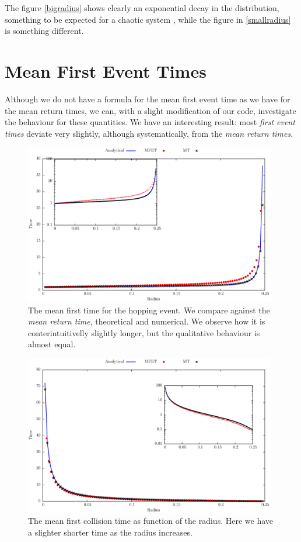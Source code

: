 \documentclass[a4paper,10pt, jcp, aps, preprint]{revtex4-1}
\begin{document}
The figure \ref{bigradius} shows clearly an exponential decay in the
distribution, something to be expected for a chaotic system \cite{OttLibro} , 
while the
figure in \ref{smallradius} is something different. 

\section{Mean First Event Times}

Although we do not have a formula for the mean first event time as
we have for the mean return times, we can, with a slight modification
of our code, investigate the behaviour for these quantities. We have 
an interesting result: most \emph{first event times} deviate very slightly,
although systematically, from the \emph{mean return times}.


\begin{figure}[h]
  \centering
  \includegraphics[width=0.98\textwidth]{./FigurasPerfectas/FistHopTime01-ForPaper.pdf}
  \caption{The mean first time for the hopping event.
    We compare against the \emph{mean return time}, theoretical
and numerical. We observe how it is conterintuitivelly slightly longer,
but the qualitative behaviour is almost equal. }\label{FirstHopp01}
\end{figure}

\begin{figure}[h]
  \centering
  \includegraphics[width=0.98\textwidth]{./FigurasPerfectas/FistCollTime02-ForPaper.pdf}
  \caption{The mean first collision time as function of the radius.
    Here we have  a slighter shorter time as the radius increases. 
 }\label{FirstCol01}
\end{figure}
\end{document}
